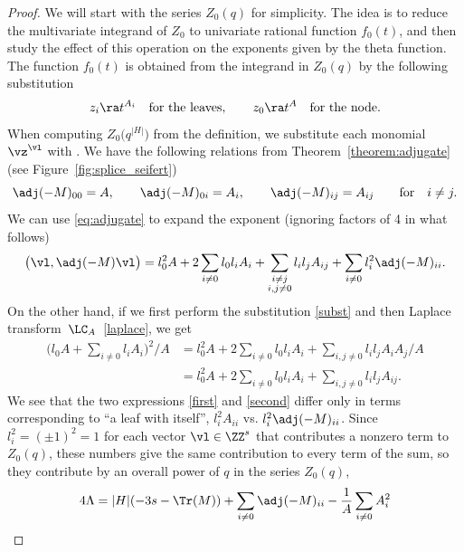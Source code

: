 \documentclass[10pt,a4paper]{amsart}
\begin{document}
\begin{proof}
	We will start with the series $Z_0(q)$ for simplicity. The idea is to reduce the multivariate integrand of $Z_0$ to univariate rational function $f_0(t)$, and then study the effect of this operation on the exponents given by the theta function. The function $f_0(t)$ is obtained from the integrand in $Z_0(q)$ by the following substitution
	\begin{gather}\label{subst}
			z_i \ra t^{A_i} \quad\mbox{for the leaves},\qquad
			z_0 \ra t^A \quad \mbox{for the node}.
	\end{gather}
	When computing $Z_0\bigl(q^{|H|}\bigr)$ from the definition, we substitute each monomial $\vz ^{\vl}$ with .
 We have the following relations from Theorem~\ref{theorem:adjugate} (see Figure~\ref{fig:splice_seifert})
 \begin{equation}\label{eq:adjugate}
 \adj(-M)_{00} = A, \qquad \adj(-M)_{0i} = A_i, \qquad \adj(-M)_{ij} = A_{ij}\qquad \text{for}\quad i \neq j.
 \end{equation}
 We can use \eqref{eq:adjugate} to expand the exponent (ignoring factors of 4 in what follows)
	\begin{equation}\label{first}
		\bigl(\vl, \adj(-M)\vl\bigr) = l_0^2 A+2\sum_{i\neq 0} l_0l_i A_{i} + \sum_{\substack{i \neq j\\ i,j \neq 0}} l_i l_j A_{ij}+\sum_{i\neq 0} l_i^2 \adj(-M)_{ii}.
	\end{equation}
	On the other hand, if we first perform the substitution \eqref{subst} and then Laplace transform~$\LC_A$~\eqref{laplace}, we get
	\begin{align}
\biggl(l_0 A + \sum_{i\neq 0}l_i A_i \biggr)^2/A & = l_0^2 A + 2 \sum_{i\neq 0} l_0 l_i A_i + \sum_{i, j\neq 0} l_i l_j A_{i}A_{j}/A \nonumber \\
& = l_0^2 A + 2 \sum_{i\neq 0} l_0 l_i A_i + \sum_{i, j\neq 0} l_i l_j A_{ij}.\label{second}
 \end{align}
We see that the two expressions \eqref{first} and \eqref{second} differ only in terms corresponding to ``a leaf with itself'', $l_i^2 A_{ii}$ vs. $l_i^2 \adj(-M)_{ii}$. Since $l_i^2 = (\pm 1)^2 = 1$ for each vector $\vl \in \ZZ^s$ that contributes a nonzero term to $Z_0(q)$, these numbers give the same contribution to every term of the sum, so they contribute by an overall power of $q$ in the series $Z_0(q)$,
 \begin{align}
		4\Lambda
		 & = |H| (-3s - \Tr(M)) + \sum_{i\neq 0}\adj(-M)_{ii} - \frac{1}{A}\sum_{i\neq 0} A_i^2 \nonumber\\

\end{align}
\end{proof}
\end{document}
